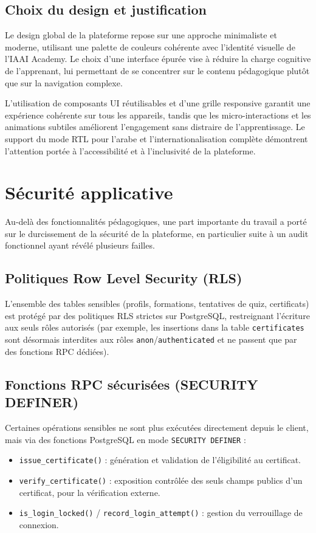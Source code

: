 \documentclass[12pt, a4paper]{report}
\begin{document}
\subsection{Choix du design et justification}

Le design global de la plateforme repose sur une approche minimaliste et moderne, utilisant une palette de couleurs cohérente avec l'identité visuelle de l'IAAI Academy. Le choix d'une interface épurée vise à réduire la charge cognitive de l'apprenant, lui permettant de se concentrer sur le contenu pédagogique plutôt que sur la navigation complexe.

L'utilisation de composants UI réutilisables et d'une grille responsive garantit une expérience cohérente sur tous les appareils, tandis que les micro-interactions et les animations subtiles améliorent l'engagement sans distraire de l'apprentissage. Le support du mode RTL pour l'arabe et l'internationalisation complète démontrent l'attention portée à l'accessibilité et à l'inclusivité de la plateforme.

\section{Sécurité applicative}
Au-delà des fonctionnalités pédagogiques, une part importante du travail a porté sur le durcissement de la sécurité de la plateforme, en particulier suite à un audit fonctionnel ayant révélé plusieurs failles.

\subsection{Politiques Row Level Security (RLS)}
L'ensemble des tables sensibles (profils, formations, tentatives de quiz, certificats) est protégé par des politiques RLS strictes sur PostgreSQL, restreignant l'écriture aux seuls rôles autorisés (par exemple, les insertions dans la table \texttt{certificates} sont désormais interdites aux rôles \texttt{anon}/\texttt{authenticated} et ne passent que par des fonctions RPC dédiées).

\subsection{Fonctions RPC sécurisées (SECURITY DEFINER)}
Certaines opérations sensibles ne sont plus exécutées directement depuis le client, mais via des fonctions PostgreSQL en mode \texttt{SECURITY DEFINER} :
\begin{itemize}
    \item \texttt{issue\_certificate()} : génération et validation de l'éligibilité au certificat.
    \item \texttt{verify\_certificate()} : exposition contrôlée des seuls champs publics d'un certificat, pour la vérification externe.
    \item \texttt{is\_login\_locked()} / \texttt{record\_login\_attempt()} : gestion du verrouillage de connexion.
\end{itemize}
\end{document}
